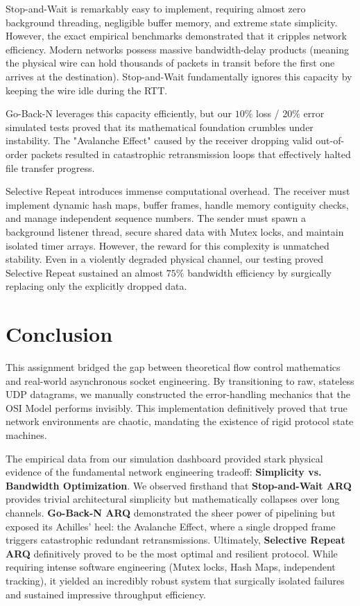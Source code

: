 \documentclass[12pt, a4paper]{article}
\begin{document}
Stop-and-Wait is remarkably easy to implement, requiring almost zero background threading, negligible buffer memory, and extreme state simplicity. However, the exact empirical benchmarks demonstrated that it cripples network efficiency. Modern networks possess massive bandwidth-delay products (meaning the physical wire can hold thousands of packets in transit before the first one arrives at the destination). Stop-and-Wait fundamentally ignores this capacity by keeping the wire idle during the RTT.

Go-Back-N leverages this capacity efficiently, but our $10\%$ loss / $20\%$ error simulated tests proved that its mathematical foundation crumbles under instability. The "Avalanche Effect" caused by the receiver dropping valid out-of-order packets resulted in catastrophic retransmission loops that effectively halted file transfer progress.

Selective Repeat introduces immense computational overhead. The receiver must implement dynamic hash maps, buffer frames, handle memory contiguity checks, and manage independent sequence numbers. The sender must spawn a background listener thread, secure shared data with Mutex locks, and maintain isolated timer arrays. However, the reward for this complexity is unmatched stability. Even in a violently degraded physical channel, our testing proved Selective Repeat sustained an almost $75\%$ bandwidth efficiency by surgically replacing only the explicitly dropped data.

\section{Conclusion}
This assignment bridged the gap between theoretical flow control mathematics and real-world asynchronous socket engineering. By transitioning to raw, stateless UDP datagrams, we manually constructed the error-handling mechanics that the OSI Model performs invisibly. This implementation definitively proved that true network environments are chaotic, mandating the existence of rigid protocol state machines.

The empirical data from our simulation dashboard provided stark physical evidence of the fundamental network engineering tradeoff: \textbf{Simplicity vs. Bandwidth Optimization}. We observed firsthand that \textbf{Stop-and-Wait ARQ} provides trivial architectural simplicity but mathematically collapses over long channels. \textbf{Go-Back-N ARQ} demonstrated the sheer power of pipelining but exposed its Achilles' heel: the Avalanche Effect, where a single dropped frame triggers catastrophic redundant retransmissions. Ultimately, \textbf{Selective Repeat ARQ} definitively proved to be the most optimal and resilient protocol. While requiring intense software engineering (Mutex locks, Hash Maps, independent tracking), it yielded an incredibly robust system that surgically isolated failures and sustained impressive throughput efficiency.
\end{document}
